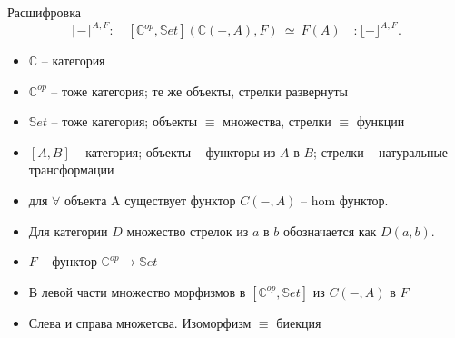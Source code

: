 \documentclass[
  russian,
  aspectratio=169,
  xcolor={svgnames},
  hyperref={colorlinks,citecolor=DeepPink4,linkcolor=DarkRed,urlcolor=DarkBlue}]{beamer}
\begin{document}
\begin{frame}[fragile]{Расшифровка}
$$
\lceil- \rceil^{A, F} :\quad
[\mathbb{C}^{op}, \mathbb{S}et](\mathbb{C}(-,A), F) \ \simeq\  F(A) 
\quad:\lfloor-\rfloor^{A, F}.
$$
\begin{minipage}{0.5\textwidth}
\begin{itemize}
  \item $\mathbb{C}$ -- категория
  \item $\mathbb{C}^{op}$ -- тоже категория; те же объекты, стрелки развернуты
  \item $\mathbb{S}et$ -- тоже категория; объекты $\equiv$ множества, стрелки $\equiv$ функции
  \item $[A,B]$ -- категория; объекты -- функторы из $A$ в $B$; стрелки -- натуральные трансформации
  \item для $\forall$ объекта A существует функтор $C(-,A)$ -- hom функтор.
  \item Для категории $D$
  множество стрелок из $a$ в $b$ обозначается как $D(a,b)$.
\end{itemize}
\end{minipage}
\begin{minipage}{0.4\textwidth}
\begin{itemize}
  \item $F$ -- функтор $\mathbb{C}^{op}\rightarrow\mathbb{S}et$
  \item В левой части множество морфизмов в $[\mathbb{C}^{op}, \mathbb{S}et]$ из $C(-,A)$ в $F$
  \item Слева и справа множетсва. Изоморфизм $\equiv$ биекция
\end{itemize}
\end{minipage}

\end{frame}
\end{document}
